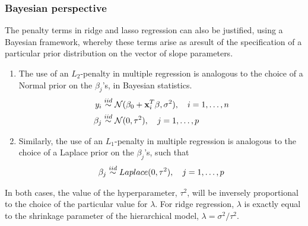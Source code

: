 \subsubsection*{Bayesian perspective}
The penalty terms in ridge and lasso regression can also be justified, using a Bayesian framework, whereby these terms arise as aresult of the specification of a particular prior distribution on the vector of slope parameters.

\begin{enumerate}
	\item The use of an $L_2$-penalty in multiple regression is analogous to the choice of a Normal prior on the $\beta_j$'s, in Bayesian statistics.
	$$
	\begin{aligned}
		y_i  &\overset{iid}{\sim} \mathcal{N}(\beta_0 + \mathbf{x}_i^T\beta, \sigma^2), \quad  i = 1, \dots, n\\
		\beta_j  &\overset{iid}{\sim} \mathcal{N}(0, \tau^2), \quad j = 1, \dots, p\\
	\end{aligned}
	$$
	\item Similarly, the use of an $L_1$-penalty in multiple regression is analogous to the choice of a Laplace prior on the $\beta_j$'s, such that
	$$
	\begin{aligned}
	\beta_j  &\overset{iid}{\sim} Laplace(0, \tau^2), \quad j = 1, \dots, p\\
	\end{aligned}	
	$$
\end{enumerate}
In both cases, the value of the hyperparameter, $\tau^2$, will be inversely proportional to the choice of the particular value for $\lambda$.
For ridge regression, $\lambda$ is exactly equal to the shrinkage parameter of the hierarchical model, $\lambda = {\sigma^2}/{\tau^2}$.









